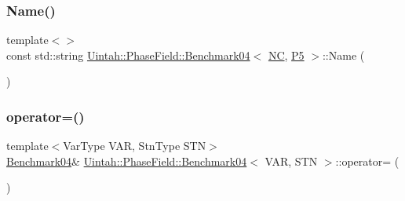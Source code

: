 \mbox{\label{classUintah_1_1PhaseField_1_1Benchmark04_a72b1767a76b88213594a41883af9e431}} 
\subsubsection{\texorpdfstring{Name()}{Name()}\hspace{0.1cm}{\footnotesize\ttfamily [2/2]}}
{\footnotesize\ttfamily template$<$$>$ \\
const std\+::string \hyperlink{classUintah_1_1PhaseField_1_1Benchmark04}{Uintah\+::\+Phase\+Field\+::\+Benchmark04}$<$ \hyperlink{namespaceUintah_1_1PhaseField_a33d355affda78a83f45755ba8388cedda77924170fe82bfd58b74ca3e44139718}{NC}, \hyperlink{namespaceUintah_1_1PhaseField_a24d833a720598df1020f5cc2e75f8702a218e7fca21085b602c79158a04bc83a0}{P5} $>$\+::Name (\begin{DoxyParamCaption}{ }\end{DoxyParamCaption})}

\mbox{\label{classUintah_1_1PhaseField_1_1Benchmark04_a4d5885a02b3a95cd6be86b8f8dead7f2}} 
\subsubsection{\texorpdfstring{operator=()}{operator=()}}
{\footnotesize\ttfamily template$<$Var\+Type V\+AR, Stn\+Type S\+TN$>$ \\
\hyperlink{classUintah_1_1PhaseField_1_1Benchmark04}{Benchmark04}\& \hyperlink{classUintah_1_1PhaseField_1_1Benchmark04}{Uintah\+::\+Phase\+Field\+::\+Benchmark04}$<$ V\+AR, S\+TN $>$\+::operator= (\begin{DoxyParamCaption}\item[{\hyperlink{classUintah_1_1PhaseField_1_1Benchmark04}{Benchmark04}$<$ V\+AR, S\+TN $>$ const \&}]{ }\end{DoxyParamCaption})\hspace{0.3cm}{\ttfamily [delete]}}



